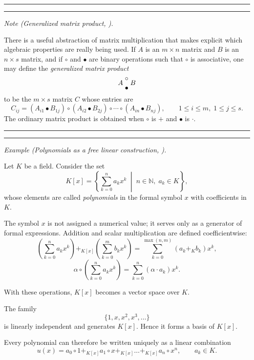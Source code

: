 \medskip
\hrule
\bigskip

\bigskip
\hrule
\medskip

\textit{Note (Generalized matrix product, \cite{knuth3}).}

There is a useful abstraction of matrix multiplication that makes explicit which algebraic properties are really being used. If $A$ is an $m\times n$ matrix and $B$ is an $n\times s$ matrix, and if $\circ$ and $\bullet$ are binary operations such that $\circ$ is associative, one may define the \emph{generalized matrix product}
\[
A\,\genfrac{}{}{0pt}{}{\circ}{\bullet}\,B
\]
to be the $m\times s$ matrix $C$ whose entries are
\[
C_{ij} = (A_{i1}\bullet B_{1j}) \circ (A_{i2}\bullet B_{2j}) \circ \cdots \circ (A_{in}\bullet B_{nj}),
\qquad 1\le i\le m,\; 1\le j\le s.
\]
The ordinary matrix product is obtained when $\circ$ is $+$ and $\bullet$ is $\cdot$.

\medskip
\hrule
\bigskip

\bigskip
\hrule
\medskip

\textit{Example (Polynomials as a free linear construction, \cite{knuth2}).}

Let $K$ be a field. Consider the set
\[
K[x] = \left\{
\sum_{k=0}^{n} a_k x^k
\;\middle|\;
n \in \mathbb{N},\; a_k \in K
\right\},
\]
whose elements are called \emph{polynomials} in the formal symbol $x$ with coefficients in $K$.

\medskip

The symbol $x$ is not assigned a numerical value; it serves only as a generator of formal expressions.
Addition and scalar multiplication are defined coefficientwise:
\[
\left( \sum_{k=0}^{n} a_k x^k \right)
+_{K[x]}
\left( \sum_{k=0}^{m} b_k x^k \right)
=
\sum_{k=0}^{\max(n,m)} (a_k +_K b_k) x^k,
\]
\[
\alpha \circ
\left( \sum_{k=0}^{n} a_k x^k \right)
=
\sum_{k=0}^{n} (\alpha \cdot a_k) x^k.
\]

\medskip

With these operations, $K[x]$ becomes a vector space over $K$.

\medskip

The family
\[
\{ 1, x, x^2, x^3, \dots \}
\]
is linearly independent and generates $K[x]$. Hence it forms a basis of $K[x]$.

\medskip

Every polynomial can therefore be written uniquely as a linear combination
\[
u(x)
=
a_0 \circ 1
+_{K[x]}
a_1 \circ x
+_{K[x]}
\dots
+_{K[x]}
a_n \circ x^n,
\qquad a_k \in K.
\]

\medskip

